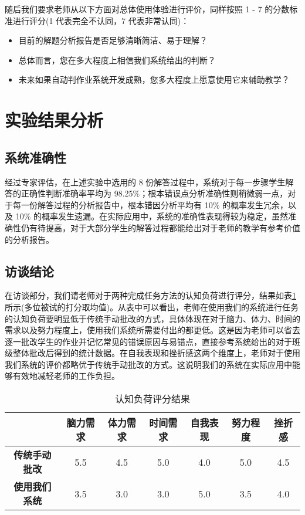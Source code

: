 随后我们要求老师从以下方面对总体使用体验进行评价，同样按照 1 - 7 的分数标准进行评分(1 代表完全不认同，7 代表非常认同)：

\begin{itemize}
    \item 目前的解题分析报告是否足够清晰简洁、易于理解？
    \item 总体而言，您在多大程度上相信我们系统给出的判断？
    \item 未来如果自动判作业系统开发成熟，您多大程度上愿意使用它来辅助教学？
\end{itemize}

\section{实验结果分析}

\subsection{系统准确性}

经过专家评估，在上述实验中选用的 8 份解答过程中，系统对于每一步骤学生解答的正确性判断准确率平均为 98.25\%；根本错误点分析准确性则稍微弱一点，对于每一份解答过程的分析报告中，根本错因分析平均有 10\% 的概率发生冗余，以及 10\% 的概率发生遗漏。在实际应用中，系统的准确性表现得较为稳定，虽然准确性仍有待提高，对于大部分学生的解答过程都能给出对于老师的教学有参考价值的分析报告。

\subsection{访谈结论}

在访谈部分，我们请老师对于两种完成任务方法的认知负荷进行评分，结果如表\ref{tab:nasa-tlx}所示(多位被试的打分取均值)。从表中可以看出，老师在使用我们的系统进行任务的认知负荷要明显低于传统手动批改的方式，具体体现在对于脑力、体力、时间的需求以及努力程度上，使用我们系统所需要付出的都更低。这是因为老师可以省去逐一批改学生的作业并记忆常见的错误原因与易错点，直接参考系统给出的对于班级整体批改后得到的统计数据。在自我表现和挫折感这两个维度上，老师对于使用我们系统的评价都略优于传统手动批改的方式。这说明我们的系统在实际应用中能够有效地减轻老师的工作负担。

\begin{table}
    \centering
    \caption{认知负荷评分结果}
    \label{tab:nasa-tlx}
    \begin{tabular}{c|cccccc}
        \toprule
        & \textbf{脑力需求} & \textbf{体力需求} & \textbf{时间需求} & \textbf{自我表现} & \textbf{努力程度} & \textbf{挫折感} \\
        \midrule
        \textbf{传统手动批改} & 5.5 & 4.5 & 5.0 & 4.0 & 5.0 & 4.5 \\
        \textbf{使用我们系统} & 3.5 & 3.0 & 3.0 & 5.0 & 3.5 & 4.0 \\
        \bottomrule
    \end{tabular}
\end{table}

